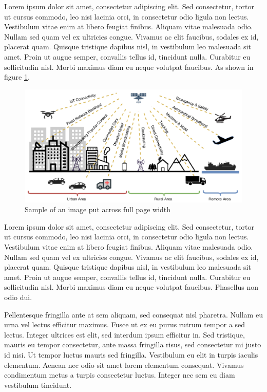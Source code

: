 Lorem ipsum dolor sit amet, consectetur adipiscing elit. Sed consectetur, tortor ut cursus commodo, leo nisi lacinia orci, in consectetur odio ligula non lectus. Vestibulum vitae enim at libero feugiat finibus. Aliquam vitae malesuada odio. Nullam sed quam vel ex ultricies congue. Vivamus ac elit faucibus, sodales ex id, placerat quam. Quisque tristique dapibus nisl, in vestibulum leo malesuada sit amet. Proin ut augue semper, convallis tellus id, tincidunt nulla. Curabitur eu sollicitudin nisl. Morbi maximus diam eu neque volutpat faucibus. As shown in figure \ref{img:img1}.
\begin{figure}[t!]
 \centering
 \includegraphics[scale=0.4]{figures/intro/1.png}
 \caption{Sample of an image put across full page width}
 \label{img:img1}
\end{figure}
Lorem ipsum dolor sit amet, consectetur adipiscing elit. Sed consectetur, tortor ut cursus commodo, leo nisi lacinia orci, in consectetur odio ligula non lectus. Vestibulum vitae enim at libero feugiat finibus. Aliquam vitae malesuada odio. Nullam sed quam vel ex ultricies congue. Vivamus ac elit faucibus, sodales ex id, placerat quam. Quisque tristique dapibus nisl, in vestibulum leo malesuada sit amet. Proin ut augue semper, convallis tellus id, tincidunt nulla. Curabitur eu sollicitudin nisl. Morbi maximus diam eu neque volutpat faucibus. Phasellus non odio dui.

Pellentesque fringilla ante at sem aliquam, sed consequat nisl pharetra. Nullam eu urna vel lectus efficitur maximus. Fusce ut ex eu purus rutrum tempor a sed lectus. Integer ultrices est elit, sed interdum ipsum efficitur in. Sed tristique, mauris eu tempor consectetur, ante massa fringilla risus, sed consectetur mi justo id nisi. Ut tempor luctus mauris sed fringilla. Vestibulum eu elit in turpis iaculis elementum. Aenean nec odio sit amet lorem elementum consequat. Vivamus condimentum metus a turpis consectetur luctus. Integer nec sem eu diam vestibulum tincidunt.

